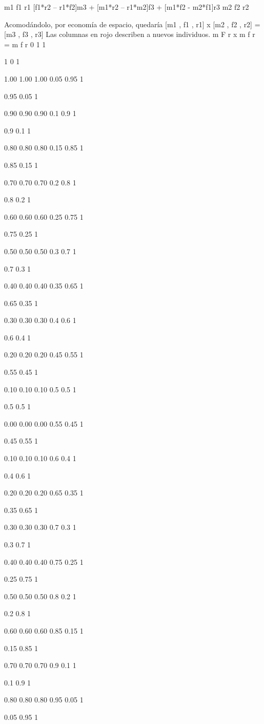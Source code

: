 m1
f1
r1
[f1*r2 – r1*f2]m3 + [m1*r2 – r1*m2]f3 + [m1*f2 - m2*f1]r3
m2
f2
r2


Acomodándolo, por economía de espacio, quedaría [m1 , f1 , r1] x [m2 , f2 , r2] = [m3 , f3 , r3]
Las columnas en rojo describen a nuevos individuos.
m
F
r
x
m
f
r
=
m
f
r
0
1
1

1
0
1

1.00
1.00
1.00
0.05
0.95
1

0.95
0.05
1

0.90
0.90
0.90
0.1
0.9
1

0.9
0.1
1

0.80
0.80
0.80
0.15
0.85
1

0.85
0.15
1

0.70
0.70
0.70
0.2
0.8
1

0.8
0.2
1

0.60
0.60
0.60
0.25
0.75
1

0.75
0.25
1

0.50
0.50
0.50
0.3
0.7
1

0.7
0.3
1

0.40
0.40
0.40
0.35
0.65
1

0.65
0.35
1

0.30
0.30
0.30
0.4
0.6
1

0.6
0.4
1

0.20
0.20
0.20
0.45
0.55
1

0.55
0.45
1

0.10
0.10
0.10
0.5
0.5
1

0.5
0.5
1

0.00
0.00
0.00
0.55
0.45
1

0.45
0.55
1

0.10
0.10
0.10
0.6
0.4
1

0.4
0.6
1

0.20
0.20
0.20
0.65
0.35
1

0.35
0.65
1

0.30
0.30
0.30
0.7
0.3
1

0.3
0.7
1

0.40
0.40
0.40
0.75
0.25
1

0.25
0.75
1

0.50
0.50
0.50
0.8
0.2
1

0.2
0.8
1

0.60
0.60
0.60
0.85
0.15
1

0.15
0.85
1

0.70
0.70
0.70
0.9
0.1
1

0.1
0.9
1

0.80
0.80
0.80
0.95
0.05
1

0.05
0.95
1

